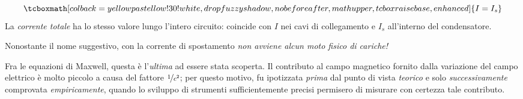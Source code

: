 \begin{equation}
	\tcboxmath[colback=yellowpastellow!30!white,drop fuzzy shadow, nobeforeafter, math upper, tcbox raise base, enhanced]{I=I_s}
\end{equation}
La \textit{corrente totale} ha lo stesso valore lungo l'intero circuito: coincide con $I$ nei cavi di collegamento e $I_s$ all'interno del condensatore.
\begin{attention}
	Nonostante il nome suggestivo, con la corrente di spostamento \textit{non avviene alcun moto fisico di cariche!}
\end{attention}
\begin{digression}
	Fra le equazioni di Maxwell, questa è l'\textit{ultima} ad essere stata scoperta. Il contributo al campo magnetico fornito dalla variazione del campo elettrico è molto piccolo a causa del fattore $\nicefrac{1}{c^2}$; per questo motivo, fu ipotizzata \textit{prima} dal punto di vista \textit{teorico} e solo \textit{successivamente}  comprovata \textit{empiricamente}, quando lo sviluppo di strumenti sufficientemente precisi permisero di misurare con certezza tale contributo.
\end{digression}
